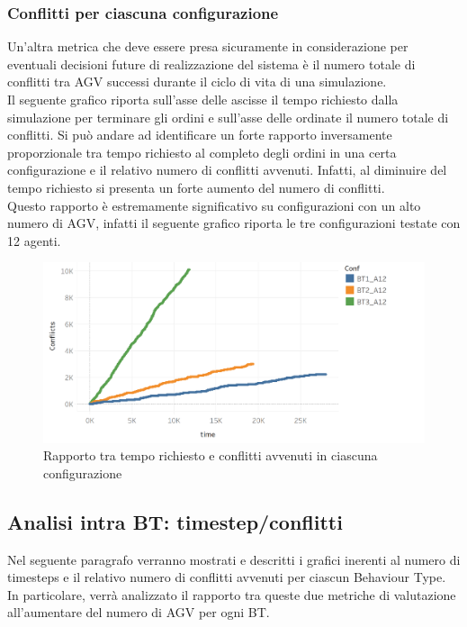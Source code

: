 \documentclass[12pt]{article}
\begin{document}
\subsubsection{Conflitti per ciascuna configurazione}
Un'altra metrica che deve essere presa sicuramente in considerazione per eventuali decisioni future di realizzazione del sistema è il numero totale di conflitti tra AGV successi durante il ciclo di vita di una simulazione.\\
Il seguente grafico riporta sull'asse delle ascisse il tempo richiesto dalla simulazione per terminare gli ordini e sull'asse delle ordinate il numero totale di conflitti. Si può andare ad identificare un forte rapporto inversamente proporzionale tra tempo richiesto al completo degli ordini in una certa configurazione e il relativo numero di conflitti avvenuti. Infatti, al diminuire del tempo richiesto si presenta un forte aumento del numero di conflitti.\\ Questo rapporto è estremamente significativo su configurazioni con un alto numero di AGV, infatti il seguente grafico riporta le tre configurazioni testate con 12 agenti.
\begin{figure}[H]
\centering
  \includegraphics[width=1\linewidth]{Figures/Results_Graphics/Rapporto_tempoconflitti.png}
  \caption{Rapporto tra tempo richiesto e conflitti avvenuti in ciascuna configurazione}\label{fig:conflicts_time_a12}
\end{figure}

\newpage

\subsection{Analisi intra BT: timestep/conflitti}
Nel seguente paragrafo verranno mostrati e descritti i grafici inerenti al numero di timesteps e il relativo numero di conflitti avvenuti per ciascun Behaviour Type. In particolare, verrà analizzato il rapporto tra queste due metriche di valutazione all'aumentare del numero di AGV per ogni BT.
\end{document}
